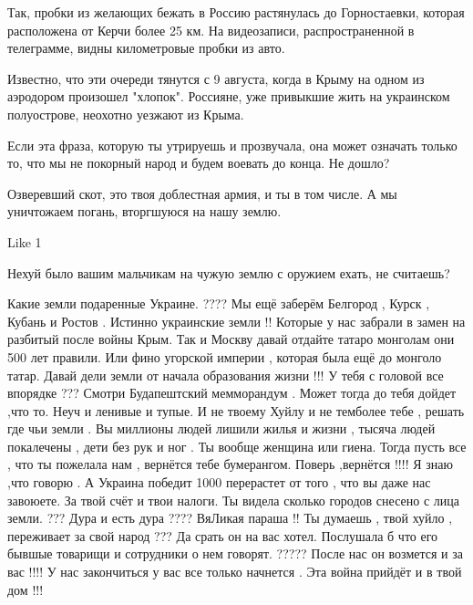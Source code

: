 {Так, пробки из желающих бежать в Россию растянулась до Горностаевки, которая
расположена от Керчи более 25 км. На видеозаписи, распространенной в
телеграмме, видны километровые пробки из авто.

Известно, что эти очереди тянутся с 9 августа, когда в Крыму на одном из
аэродором произошел "хлопок". Россияне, уже привыкшие жить на украинском
полуострове, неохотно уезжают из Крыма.


Если эта фраза, которую ты утрируешь и прозвучала, она может означать только
то, что мы не покорный народ и будем воевать до конца. Не дошло?

Озверевший скот, это твоя доблестная армия, и ты в том числе. А мы уничтожаем погань, вторгшуюся на нашу землю.

    Like 1

Нехуй было вашим мальчикам на чужую землю с оружием ехать, не считаешь?


Какие земли подаренные Украине. ???? Мы ещё заберём Белгород , Курск , Кубань и
Ростов . Истинно украинские земли !! Которые у нас забрали в замен на разбитый
после войны Крым. Так и Москву давай отдайте татаро монголам они 500 лет
правили. Или фино угорской империи , которая была ещё до монголо татар. Давай
дели земли от начала образования жизни !!! У тебя с головой все впорядке ???
Смотри Будапештский мемморандум . Может тогда до тебя дойдет ,что то. Неуч и
ленивые и тупые. И не твоему Хуйлу и не темболее тебе , решать где чьи земли .
Вы миллионы людей лишили жилья и жизни , тысяча людей покалечены , дети без рук
и ног . Ты вообще женщина или гиена. Тогда пусть все , что ты пожелала нам ,
вернётся тебе бумерангом. Поверь ,вернётся !!!! Я знаю ,что говорю . А Украина
победит 1000 %
перерастет от того , что вы даже нас завоюете. За твой счёт и твои налоги. Ты
видела сколько городов снесено с лица земли. ??? Дура и есть дура ???? ВяЛикая
параша !! Ты думаешь , твой хуйло , переживает за свой народ ??? Да срать он на
вас хотел. Послушала б что его бывшые товарищи и сотрудники о нем говорят.
????? После нас он возмется и за вас !!!! У нас закончиться у вас все только
начнется . Эта война прийдёт и в твой дом !!!


}
